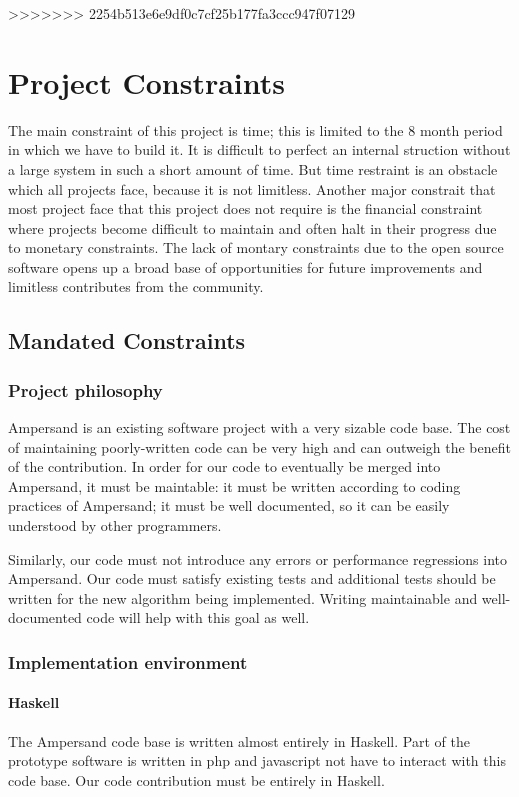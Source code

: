 \documentclass[12pt]{report}
\begin{document}
>>>>>>> 2254b513e6e9df0c7cf25b177fa3ccc947f07129
\chapter{Project Constraints}\label{ch:Constraints}
The main constraint of this project is time; this is limited to the 8 month 
period in which we have to build it. It is difficult to perfect an internal 
struction without a large system in such a short amount of time. But time 
restraint is an obstacle which all projects face, because it is not limitless. 
Another major constrait that most project face that this project does not 
require is the financial constraint where projects become difficult to maintain 
and often halt in their progress due to monetary constraints. The lack of 
montary constraints due to the open source software opens up a broad base of 
opportunities for future improvements and limitless contributes from the 
community.
\section{Mandated Constraints}\label{sec:Constraints}

\subsection{Project philosophy}

Ampersand is an existing software project with a very sizable code base. The
cost of maintaining poorly-written code can be very high and can outweigh the
benefit of the contribution. In order for our code to eventually be merged into
Ampersand, it must be maintable: it must be written according to coding
practices of Ampersand; it must be well documented, so it can be easily
understood by other programmers. 

Similarly, our code must not introduce any errors or performance regressions
into Ampersand. Our code must satisfy existing tests and additional tests should
be written for the new algorithm being implemented. Writing maintainable and
well-documented code will help with this goal as well.


\subsection{Implementation environment}
\subsubsection*{Haskell}
The Ampersand code base is written almost entirely in Haskell. Part of the
prototype software is written in php and javascript %
not have to interact with this code base. Our code contribution must be entirely
in Haskell.
\end{document}
